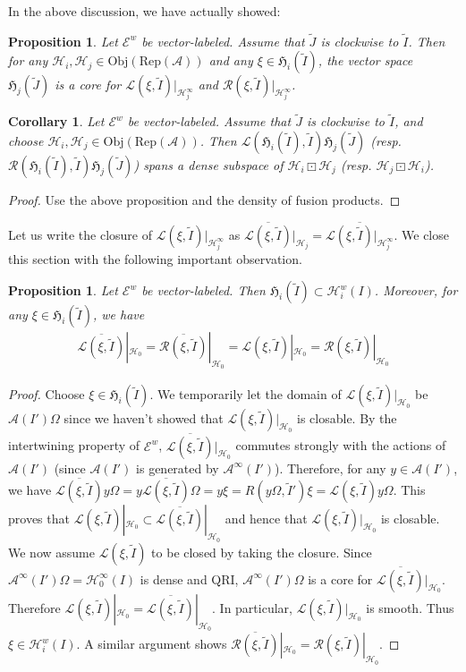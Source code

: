 \documentclass[11pt,b5paper,notitlepage]{article}
\theoremstyle{definition}
\theoremstyle{plain}
\newtheorem{pp}[df]{Proposition}
\newtheorem{co}[df]{Corollary}
\newcommand{\fk}{\mathfrak}
\newcommand{\mc}{\mathcal}
\newcommand{\wtd}{\widetilde}
\newcommand{\ovl}{\overline}
\newcommand{\scr}{\mathscr}
\newcommand{\RepA}{\mathrm{Rep}(\mc A)}
\newcommand{\Obj}{\mathrm{Obj}}
\numberwithin{equation}{subsection}
\begin{document}
In the above discussion, we have actually showed:

\begin{pp}\label{lb23}
Let $\scr E^w$ be vector-labeled. Assume that $\wtd J$ is clockwise to $\wtd I$. Then for any $\mc H_i,\mc H_j\in\Obj(\RepA)$ and any $\xi\in\fk H_i(\wtd I)$, the vector space $\fk H_j(\wtd J)$ is a core for $\mc L(\xi,\wtd I)|_{\mc H_j^\infty}$ and $\mc R(\xi,\wtd I)|_{\mc H_j^\infty}$.
\end{pp}

\begin{co}\label{lb22}
Let $\scr E^w$ be vector-labeled. Assume that $\wtd J$ is clockwise to $\wtd I$, and choose $\mc H_i,\mc H_j\in\Obj(\RepA)$. Then  $\mc L(\fk H_i(\wtd I),\wtd I)\fk H_j(\wtd J)$ (resp. $\mc R(\fk H_i(\wtd I),\wtd I)\fk H_j(\wtd J)$) spans a dense subspace of $\mc H_i\boxdot\mc H_j$ (resp. $\mc H_j\boxdot\mc H_i$).
\end{co}
\begin{proof}
Use the above proposition and the density of fusion products.
\end{proof}

Let us write the closure of $\mc L(\xi,\wtd I)|_{\mc H_j^\infty}$ as $\ovl{\mc L(\xi,\wtd I)}|_{\mc H_j}=\ovl{\mc L(\xi,\wtd I)|_{\mc H_j^\infty}}$.  We close this section with the following important observation.

\begin{pp}\label{lb27}
Let $\scr E^w$ be vector-labeled. Then $\fk H_i(\wtd I)\subset\mc H_i^w(I)$. Moreover, for any $\xi\in\fk H_i(\wtd I)$, we have
\begin{align}
\ovl{\mc L(\xi,\wtd I)}|_{\mc H_0}=\ovl{\mc R(\xi,\wtd I)}|_{\mc H_0}=\scr L(\xi,\wtd I)|_{\mc H_0}=\scr R(\xi,\wtd I)|_{\mc H_0}\label{eq25}
\end{align}
\end{pp}

\begin{proof}
Choose $\xi\in\fk H_i(\wtd I)$. We temporarily let the domain of $\scr L(\xi,\wtd I)|_{\mc H_0}$ be $\mc A(I')\Omega$ since we haven't showed that $\scr L(\xi,\wtd I)|_{\mc H_0}$ is closable. By the intertwining property of $\scr E^w$, $\ovl{\mc L(\xi,\wtd I)}|_{\mc H_0}$ commutes strongly with the actions of $\mc A(I')$ (since $\mc A(I')$ is generated by $\mc A^\infty(I')$). Therefore, for any $y\in\mc A(I')$, we have $\ovl{\mc L(\xi,\wtd I)}y\Omega=y\ovl{\mc L(\xi,\wtd I)}\Omega=y\xi=R(y\Omega,\wtd I')\xi=\scr L(\xi,\wtd I)y\Omega$. This proves that $\scr L(\xi,\wtd I)|_{\mc H_0}\subset\ovl{\mc L(\xi,\wtd I)}|_{\mc H_0}$ and hence that $\scr L(\xi,\wtd I)|_{\mc H_0}$ is closable. We now assume $\scr L(\xi,\wtd I)$ to be closed by taking the closure. Since $\mc A^\infty(I')\Omega=\mc H_0^\infty(I)$ is dense and QRI, $\mc A^\infty(I')\Omega$ is a core for $\ovl{\mc L(\xi,\wtd I)}|_{\mc H_0}$. Therefore $\scr L(\xi,\wtd I)|_{\mc H_0}=\ovl{\mc L(\xi,\wtd I)}|_{\mc H_0}$. In particular, $\scr L(\xi,\wtd I)|_{\mc H_0}$ is smooth. Thus $\xi\in\mc H_i^w(I)$. A similar argument shows $\ovl{\mc R(\xi,\wtd I)}|_{\mc H_0}=\scr R(\xi,\wtd I)|_{\mc H_0}$.
\end{proof}
\end{document}
